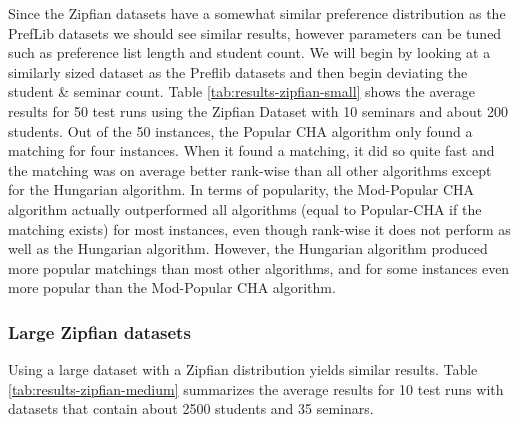 Since the Zipfian datasets have a somewhat similar preference distribution as the PrefLib datasets we should see similar results, however parameters can be tuned such as preference list length and student count. We will begin by looking at a similarly sized dataset as the Preflib datasets and then begin deviating the student \& seminar count. Table \ref{tab:results-zipfian-small}
shows the average results for 50 test runs using the Zipfian Dataset with 10 seminars and about 200 students. Out of the 50 instances, the Popular CHA algorithm only found a matching for four instances. When it found a matching, it did so quite fast and the matching was on average better rank-wise than all other algorithms except for the Hungarian algorithm. In terms of popularity, the Mod-Popular CHA algorithm actually outperformed all algorithms (equal to Popular-CHA if the matching exists) for most instances, even though rank-wise it does not perform as well as the Hungarian algorithm. However, the Hungarian algorithm produced more popular matchings than most other algorithms, and for some instances even more popular than the Mod-Popular CHA algorithm.

\subsubsection{Large Zipfian datasets}
Using a large dataset with a Zipfian distribution yields similar results. Table \ref{tab:results-zipfian-medium} summarizes the average results for 10 test runs with datasets that contain about 2500 students and 35 seminars.

\begin{table}[h!]
  \centering
  \caption{Average results for large Zipfian dataset (2500 Students) with 10 runs}
  \label{tab:results-zipfian-medium}
\end{table}

